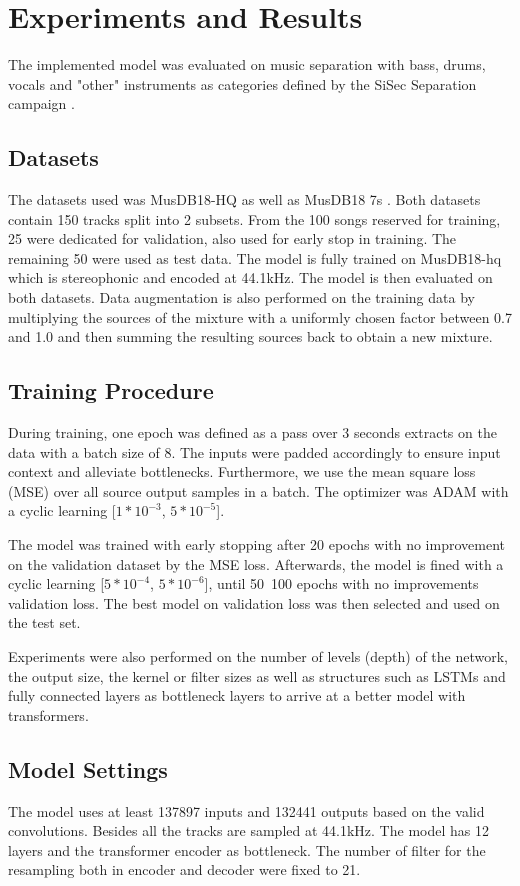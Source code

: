 \documentclass[final]{cvpr}
\begin{document}
\section{Experiments and Results}
 The implemented model was evaluated on music separation with bass, drums, vocals and "other" instruments as categories defined by the SiSec Separation campaign \cite{SiSec}.
\subsection{Datasets}
The datasets used was MusDB18-HQ \cite{MUSDB18HQ} as well as MusDB18 7s \cite{musdb18}. Both datasets contain 150 tracks split into 2 subsets. From the 100 songs reserved for training, 25 were dedicated for validation, also used for early stop in training. The remaining 50 were used as test data. The model is fully trained on MusDB18-hq which is stereophonic and encoded at 44.1kHz. The model is then evaluated on both datasets.
Data augmentation is also performed on the training data by multiplying the sources of the mixture with a uniformly chosen factor between 0.7 and 1.0 and then summing the resulting sources back to obtain a new mixture.\cite{waveunet}  
\subsection{Training Procedure}
During training, one epoch was defined as a pass over 3 seconds extracts on the data with a batch size of 8. The inputs were padded accordingly to ensure input context and alleviate bottlenecks. Furthermore, we use the mean square loss (MSE) over all source output samples in a batch. The optimizer was ADAM with a cyclic learning [$1*10^{-3}$, $5*10^{-5}$]. 

The model was trained with early stopping after 20 epochs with no improvement on the validation dataset by the MSE loss. Afterwards, the model is fined with a cyclic learning [$5*10^{-4}$, $5*10^{-6}$], until 50~100 epochs with no improvements validation loss. The best model on validation loss was then selected and used on the test set. 

Experiments were also performed on the number of levels (depth) of the network, the output size, the kernel or filter sizes as well as structures such as LSTMs and fully connected layers as bottleneck layers to arrive at a better model with transformers.   
\subsection{Model Settings}
The model uses at least 137897 inputs and 132441 outputs based on the valid convolutions. Besides all the tracks are sampled at 44.1kHz. The model has 12 layers and the transformer encoder as bottleneck. The number of filter for the resampling both in encoder and decoder were fixed to 21.
\end{document}
